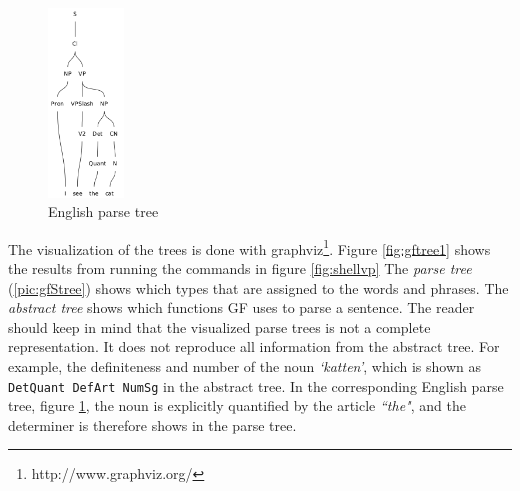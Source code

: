 \documentclass{report}
\begin{document}
\begin{figure}
\includegraphics[width=20mm]{gfETree.png}
\caption{English parse tree}
\label{pic:gfEtree}
\end{figure}
The visualization of the trees is done with graphviz\footnote{http://www.graphviz.org/}.
Figure \ref{fig:gftree1} shows the results from running the commands in figure \ref{fig:shellvp}
The \textit{parse tree} (\ref{pic:gfStree}) shows which types
that are assigned to the words and phrases. 
The \textit{abstract tree} shows which functions GF uses
to parse a sentence.
The reader should keep in mind that the visualized parse trees is not a
complete representation. It does not reproduce all information from the abstract tree.
For example, the definiteness and number of the noun \emph{`katten'}, which is shown as
\verb-DetQuant DefArt NumSg- in the abstract tree.
In the corresponding English parse tree, figure \ref{pic:gfEtree},
the noun is explicitly quantified by the article \emph{``the"},
and the determiner is therefore shows in the parse tree.\\

\end{document}
